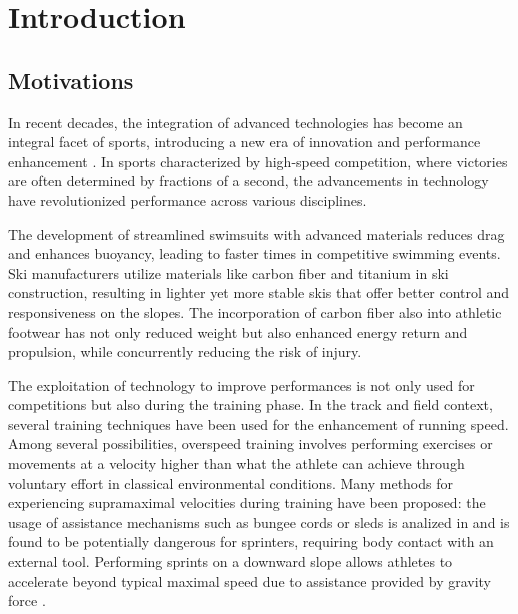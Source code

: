 \documentclass[a4paper,12pt,oneside]{book}
\begin{document}

\tableofcontents
\thispagestyle{empty}


\chapter*{Introduction}
	
\section*{Motivations}

In recent decades, the integration of advanced technologies has become an integral facet of sports, introducing a new era of innovation and performance enhancement \cite{Technology_athletics}. 
In sports characterized by high-speed competition, where victories are often determined by fractions of a second, the advancements in technology have revolutionized performance across various disciplines. 
\bigskip

The development of streamlined swimsuits with advanced materials reduces drag and enhances buoyancy, leading to faster times in competitive swimming events.
Ski manufacturers utilize materials like carbon fiber and titanium in ski construction, resulting in lighter yet more stable skis that offer better control and responsiveness on the slopes.
The incorporation of carbon fiber also into athletic footwear has not only reduced weight but also enhanced energy return and propulsion, while concurrently reducing the risk of injury.
\bigskip

The exploitation of technology to improve performances is not only used for competitions but also during the training phase. 
In the track and field context, several training techniques have been used for the enhancement of running speed. 
Among several possibilities, overspeed training involves performing exercises or movements at a velocity higher than what the athlete can achieve through voluntary effort in classical environmental conditions. 
Many methods for experiencing supramaximal velocities during training have been proposed: the usage of assistance mechanisms such as bungee cords or sleds is analized in \cite{Elastic_cord} and is found to be potentially dangerous for sprinters, requiring body contact with an external tool.
Performing sprints on a downward slope allows athletes to accelerate beyond typical maximal speed due to assistance provided by gravity force \cite{Hill_slope}.
\bigskip
\end{document}
